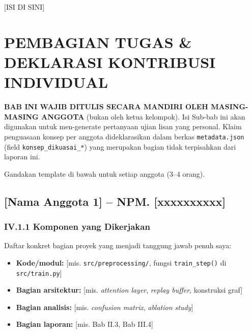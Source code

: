 \documentclass[11pt,a4paper,oneside]{report}
\begin{document}
[ISI DI SINI]

\chapter{PEMBAGIAN TUGAS \& DEKLARASI KONTRIBUSI INDIVIDUAL}
\label{bab:kontribusi}

\begin{petunjuk}
\textbf{BAB INI WAJIB DITULIS SECARA MANDIRI OLEH MASING-MASING ANGGOTA} (bukan oleh ketua kelompok). Isi Sub-bab ini akan digunakan untuk men-generate pertanyaan ujian lisan yang personal. Klaim penguasaan konsep per anggota dideklarasikan dalam berkas \texttt{metadata.json} (field \texttt{konsep\_dikuasai\_*}) yang merupakan bagian tidak terpisahkan dari laporan ini.

Gandakan template di bawah untuk setiap anggota (3--4 orang).
\end{petunjuk}

\section{[Nama Anggota 1] -- NPM. [xxxxxxxxxx]}

\subsection*{IV.1.1 Komponen yang Dikerjakan}
Daftar konkret bagian proyek yang menjadi tanggung jawab penuh saya:
\begin{itemize}[leftmargin=*]
    \item \textbf{Kode/modul:} [mis. \texttt{src/preprocessing/}, fungsi \texttt{train\_step()} di \texttt{src/train.py}]
    \item \textbf{Bagian arsitektur:} [mis. \textit{attention layer}, \textit{replay buffer}, konstruksi graf]
    \item \textbf{Bagian analisis:} [mis. \textit{confusion matrix}, \textit{ablation study}]
    \item \textbf{Bagian laporan:} [mis. Bab II.3, Bab III.4]
\end{itemize}
\end{document}
